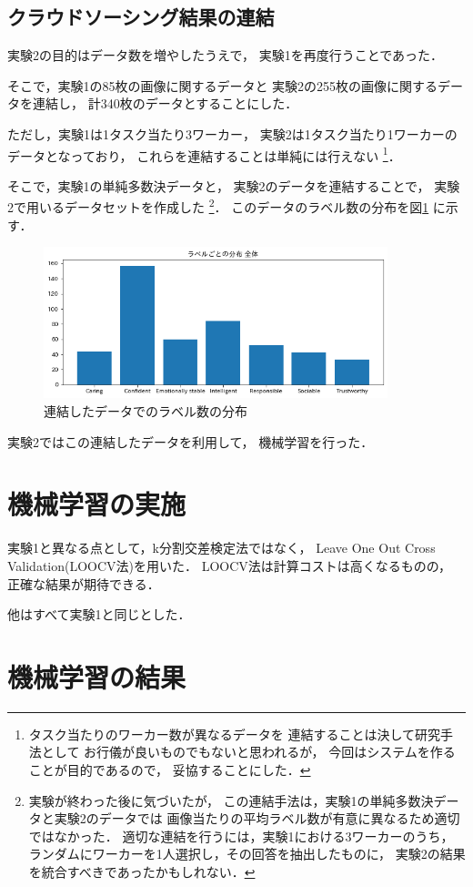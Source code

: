 \subsection{クラウドソーシング結果の連結}
実験2の目的はデータ数を増やしたうえで，
実験1を再度行うことであった．

そこで，実験1の85枚の画像に関するデータと
実験2の255枚の画像に関するデータを連結し，
計340枚のデータとすることにした．

ただし，実験1は1タスク当たり3ワーカー，
実験2は1タスク当たり1ワーカーのデータとなっており，
これらを連結することは単純には行えない
\footnote{タスク当たりのワーカー数が異なるデータを
連結することは決して研究手法として
お行儀が良いものでもないと思われるが，
今回はシステムを作ることが目的であるので，
妥協することにした．}．

そこで，実験1の単純多数決データと，
実験2のデータを連結することで，
実験2で用いるデータセットを作成した
\footnote{
実験が終わった後に気づいたが，
この連結手法は，実験1の単純多数決データと実験2のデータでは
画像当たりの平均ラベル数が有意に異なるため適切ではなかった．
適切な連結を行うには，実験1における3ワーカーのうち，
ランダムにワーカーを1人選択し，その回答を抽出したものに，
実験2の結果を統合すべきであったかもしれない．
}．
このデータのラベル数の分布を図\ref{fig:ch3:label_uni}
に示す．
\begin{figure}[tb]
  \centering
  \includegraphics[width=10cm]{ch3/plot_label_uni.png}
  \caption{連結したデータでのラベル数の分布
  \label{fig:ch3:label_uni}}
\end{figure}
実験2ではこの連結したデータを利用して，
機械学習を行った．

\section{機械学習の実施}
実験1と異なる点として，k分割交差検定法ではなく，
Leave One Out Cross Validation(LOOCV法)を用いた．
LOOCV法は計算コストは高くなるものの，
正確な結果が期待できる．

他はすべて実験1と同じとした．
\section{機械学習の結果}

